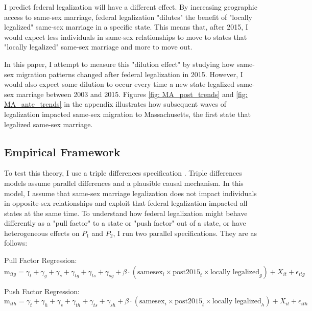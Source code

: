 \documentclass[12pt,letterpaper]{article}
\begin{document}
I predict federal legalization will have a different effect. By increasing geographic access to same-sex marriage, federal legalization "dilutes" the benefit of "locally legalized" same-sex marriage in a specific state. This means that, after 2015, I would expect less individuals in same-sex relationships to move to states that "locally legalized" same-sex marriage and more to move out.

In this paper, I attempt to measure this "dilution effect" by studying how same-sex migration patterns changed after federal legalization in 2015. However, I would also expect some dilution to occur every time a new state legalized same-sex marriage between 2003 and 2015. Figures \ref{fig: MA_post_trends} and \ref{fig: MA_ante_trends} in the appendix illustrates how subsequent waves of legalization impacted same-sex migration to Massachusetts, the first state that legalized same-sex marriage.

\subsection{Empirical Framework}

To test this theory, I use a triple differences specification \citep{23, 24, 25}. Triple differences models assume parallel differences and a plausible causal mechanism. In this model, I assume that same-sex marriage legalization does not impact individuals in opposite-sex relationships and exploit that federal legalization impacted all states at the same time. To understand how federal legalization might behave differently as a "pull factor" to a state or "push factor" out of a state, or have heterogeneous effects on $P_1$ and $P_2$, I run two parallel specifications. They are as follows:

\hfill
\break
Pull Factor Regression:
\begin{equation}
\text{m}_{itg} = \gamma_t + \gamma_g + \gamma_s + \gamma_{tg} + \gamma_{ts} + \gamma_{sg} + \beta \cdot (\text{samesex}_i \times \text{post2015}_t \times \text{locally legalized}_g) 
+ X_{it} + \epsilon_{itg}
\end{equation}

\hfill
\break
Push Factor Regression:
\begin{equation}
\text{m}_{ith} = \gamma_t + \gamma_h + \gamma_s + \gamma_{th} + \gamma_{ts} + \gamma_{sh} + \beta \cdot (\text{samesex}_i \times \text{post2015}_t \times \text{locally legalized}_h) 
+ X_{it} + \epsilon_{ith}
\end{equation}
\end{document}
